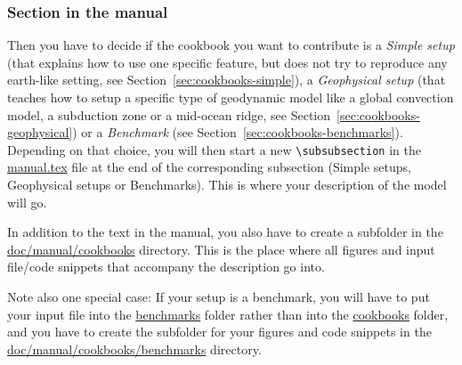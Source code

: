 \documentclass{article}
\begin{document}
\subsubsection{Section in the manual}

Then you have to decide if the cookbook you want to contribute is a \textit{Simple setup}
(that explains how to use one specific feature, but does not try to reproduce any
earth-like setting, see Section~\ref{sec:cookbooks-simple}), a \textit{Geophysical setup} 
(that teaches how to setup a specific type of geodynamic model like a global convection model, 
a subduction zone or a mid-ocean ridge, see Section~\ref{sec:cookbooks-geophysical})
or a \textit{Benchmark} (see Section~\ref{sec:cookbooks-benchmarks}).
Depending on that choice, you will then start a new \verb!\subsubsection! in the
\href{doc/manual/manual.tex}{manual.tex} file at the end of the
corresponding subsection (Simple setups, Geophysical setups or Benchmarks). This is where
your description of the model will go.

In addition to the text in the manual, you also have to create a subfolder
in the \href{doc/manual/cookbooks/.}{doc/manual/cookbooks} directory.
This is the place where all figures and input file/code snippets that accompany the description
go into.

Note also one special case: If your setup is a benchmark, you will have to put your input file into the 
\href{benchmarks/.}{benchmarks} folder rather than into the \href{cookbooks/.}{cookbooks} folder, 
and you have to create the subfolder for your figures and code snippets in the 
\href{doc/manual/cookbooks/benchmarks/.}{doc/manual/cookbooks/benchmarks} directory.
\end{document}
